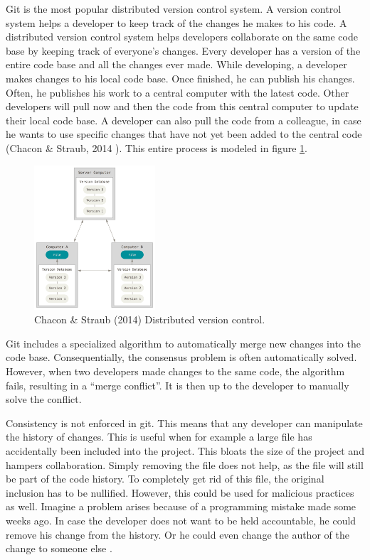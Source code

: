 Git is the most popular distributed version control system. A version control system helps a developer to keep track of the changes he makes to his code. A distributed version control system helps developers collaborate on the same code base by keeping track of everyone's changes. Every developer has a version of the entire code base and all the changes ever made. While developing, a developer makes changes to his local code base. Once finished, he can publish his changes. Often, he publishes his work to a central computer with the latest code. Other developers will pull now and then the code from this central computer to update their local code base. A developer can also pull the code from a colleague, in case he wants to use specific changes that have not yet been added to the central code (Chacon \& Straub, 2014 \cite{git-manual-book}). This entire process is modeled in figure \ref{fig:distributed-vcs}.


\begin{figure}[h]
\centering
\includegraphics[width=0.4\textwidth]{paper-images/distributed.png}
\caption{Chacon \& Straub (2014) Distributed version control.} 
\label{fig:distributed-vcs}
\end{figure}

Git includes a specialized algorithm to automatically merge new changes into the code base. Consequentially, the consensus problem is often automatically solved. However, when two developers made changes to the same code, the algorithm fails, resulting in a ``merge conflict''. It is then up to the developer to manually solve the conflict. 

Consistency is not enforced in git. This means that any developer can manipulate the history of changes. This is useful when for example a large file has accidentally been included into the project. This bloats the size of the project and hampers collaboration. Simply removing the file does not help, as the file will still be part of the code history. To completely get rid of this file, the original inclusion has to be nullified. However, this could be used for malicious practices as well. Imagine a problem arises because of a programming mistake made some weeks ago. In case the developer does not want to be held accountable, he could remove his change from the history. Or he could even change the author of the change to someone else \cite{change-author-commit}.

